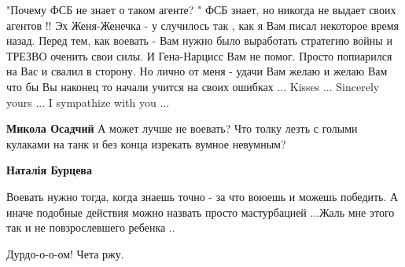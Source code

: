 \begin{itemize}
\begin{itemize}
 

"Почему ФСБ не знает о таком агенте? " ФСБ знает, но никогда не выдает своих
агентов !! Эх Женя-Женечка - у случилось так , как я Вам писал некоторое время
назад. Перед тем, как воевать - Вам нужно было выработать стратегию войны и
ТРЕЗВО оченить свои силы. И Гена-Нарцисс Вам не помог. Просто попиарился на Вас
и свалил в сторону. Но лично от меня - удачи Вам желаю и желаю Вам что бы Вы
наконец то начали учится на своих ошибках ... Kisses ... Sincerely yours ... I
sympathize with you ...


 
\textbf{Микола Осадчий} А может лучше не воевать? Что толку лезть с голыми кулаками на танк и без конца изрекать вумное невумным?

 
\textbf{Наталія Бурцева} 

Воевать нужно тогда, когда знаешь точно - за что воюешь и можешь победить. А
иначе подобные действия можно назвать просто мастурбацией ...Жаль мне этого так
и не повзрослевшего ребенка ..

\end{itemize}

 
Дурдо-о-о-ом! Чета ржу.

\end{itemize}

